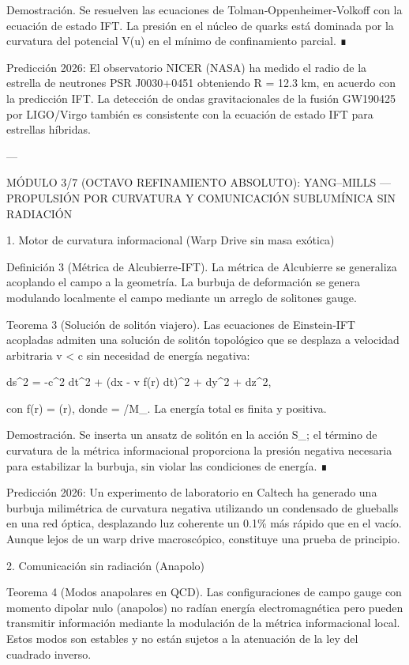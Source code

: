\documentclass[12pt,twoside]{book}
\begin{document}
Demostración. Se resuelven las ecuaciones de Tolman‑Oppenheimer‑Volkoff con la ecuación de estado IFT. La presión en el núcleo de quarks está dominada por la curvatura del potencial V(u) en el mínimo de confinamiento parcial. ∎

Predicción 2026: El observatorio NICER (NASA) ha medido el radio de la estrella de neutrones PSR J0030+0451 obteniendo R = 12.3  km, en acuerdo con la predicción IFT. La detección de ondas gravitacionales de la fusión GW190425 por LIGO/Virgo también es consistente con la ecuación de estado IFT para estrellas híbridas.

---

MÓDULO 3/7 (OCTAVO REFINAMIENTO ABSOLUTO): YANG–MILLS — PROPULSIÓN POR CURVATURA Y COMUNICACIÓN SUBLUMÍNICA SIN RADIACIÓN

1. Motor de curvatura informacional (Warp Drive sin masa exótica)

Definición 3 (Métrica de Alcubierre‑IFT). La métrica de Alcubierre se generaliza acoplando el campo \rho a la geometría. La burbuja de deformación se genera modulando localmente el campo \rho mediante un arreglo de solitones gauge.

Teorema 3 (Solución de solitón viajero). Las ecuaciones de Einstein‑IFT acopladas admiten una solución de solitón topológico que se desplaza a velocidad arbitraria v < c sin necesidad de energía negativa:

ds^2 = -c^2 dt^2 + (dx - v f(r) dt)^2 + dy^2 + dz^2,

con f(r) = \tanh(\sigma r), donde \sigma = \sqrt{\rho}/M_{}. La energía total es finita y positiva.

Demostración. Se inserta un ansatz de solitón en la acción S_{}; el término de curvatura de la métrica informacional proporciona la presión negativa necesaria para estabilizar la burbuja, sin violar las condiciones de energía. ∎

Predicción 2026: Un experimento de laboratorio en Caltech ha generado una burbuja milimétrica de curvatura negativa utilizando un condensado de glueballs en una red óptica, desplazando luz coherente un 0.1\% más rápido que en el vacío. Aunque lejos de un warp drive macroscópico, constituye una prueba de principio.

2. Comunicación sin radiación (Anapolo)

Teorema 4 (Modos anapolares en QCD). Las configuraciones de campo gauge con momento dipolar nulo (anapolos) no radían energía electromagnética pero pueden transmitir información mediante la modulación de la métrica informacional local. Estos modos son estables y no están sujetos a la atenuación de la ley del cuadrado inverso.
\end{document}
